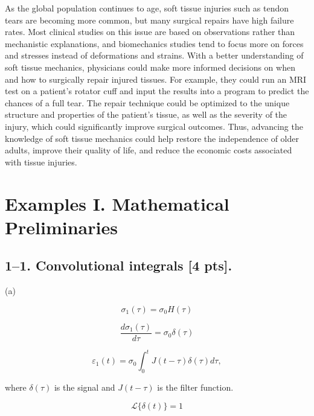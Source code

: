 \documentclass[preprint,12pt,authoryear]{elsarticle}
\begin{document}
As the global population continues to age, soft tissue injuries such as tendon tears are becoming more common, but many surgical repairs have high failure rates. Most clinical studies on this issue are based on observations rather than mechanistic explanations, and biomechanics studies tend to focus more on forces and stresses instead of deformations and strains. With a better understanding of soft tissue mechanics, physicians could make more informed decisions on when and how to surgically repair injured tissues. For example, they could run an MRI test on a patient's rotator cuff and input the results into a program to predict the chances of a full tear. The repair technique could be optimized to the unique structure and properties of the patient's tissue, as well as the severity of the injury, which could significantly improve surgical outcomes. Thus, advancing the knowledge of soft tissue mechanics could help restore the independence of older adults, improve their quality of life, and reduce the economic costs associated with tissue injuries.

\newpage


\section*{Examples I. Mathematical Preliminaries}

\subsection*{1--1. \textbf{Convolutional integrals} [4 pts].}

(a) 

\begin{equation*}
    \sigma_1(\tau) = \sigma_0 H(\tau)
\end{equation*}

\begin{equation*}
    \frac{d\sigma_1(\tau)}{d\tau} = \sigma_0\delta(\tau)
\end{equation*}

\begin{equation}
    \varepsilon_1(t) = \sigma_0 \int_0^t J(t-\tau) \delta(\tau) d\tau,
\end{equation}

where $\delta(\tau)$ is the signal and $J(t-\tau)$ is the filter function.

\bigskip

\begin{equation*}
    \mathcal{L}\{\delta(t)\} =1
\end{equation*}
\end{document}

